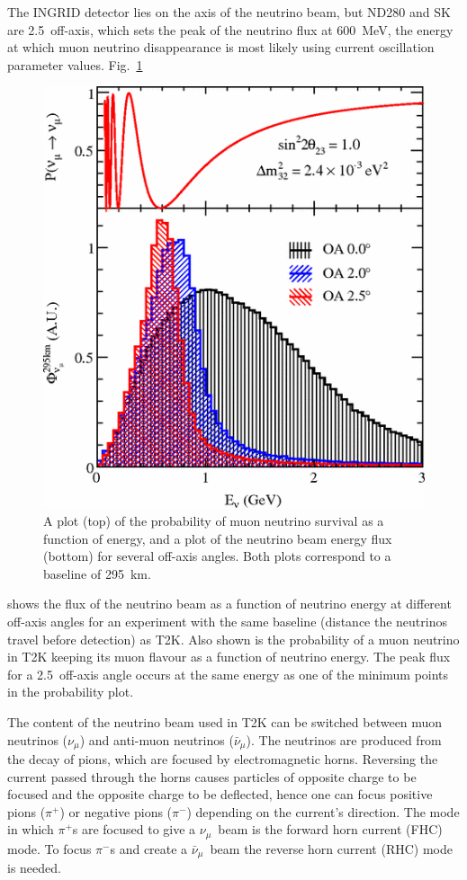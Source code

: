 \documentclass[aps,pra,12pt,notitlepage,tightenlines]{revtex4-1}
\newcommand{\numu}{$\nu_\mu$}
\newcommand{\anumu}{$\bar\nu_\mu$}
\begin{document}
The INGRID detector lies on the axis of the neutrino beam, but ND280 and SK are 2.5\degree\ off-axis, which sets the peak of the neutrino flux at 600~MeV, the energy at which muon neutrino disappearance is most likely using current oscillation parameter values. Fig.\ \ref{fig:axis} 
\begin{figure}
 \includegraphics[scale=0.5]{axis.png}
 \caption{A plot (top) of the probability of muon neutrino survival as a function of energy, and a plot of the neutrino beam energy flux (bottom) for several off-axis angles. Both plots correspond to a baseline of 295~km.}
 \label{fig:axis}
\end{figure}
shows the flux of the neutrino beam as a function of neutrino energy at different off-axis angles for an experiment with the same baseline (distance the neutrinos travel before detection) as T2K. Also shown is the probability of a muon neutrino in T2K keeping its muon flavour as a function of neutrino energy. The peak flux for a 2.5\degree\ off-axis angle occurs at the same energy as one of the minimum points in the probability plot.

The content of the neutrino beam used in T2K can be switched between muon neutrinos (\numu) and anti-muon neutrinos (\anumu). The neutrinos are produced from the decay of pions, which are focused by electromagnetic horns. Reversing the current passed through the horns causes particles of opposite charge to be focused and the opposite charge to be deflected, hence one can focus positive pions ($\pi^+$) or negative pions ($\pi^-$) depending on the current's direction. The mode in which $\pi^+$s are focused to give a \numu \ beam is the forward horn current (FHC) mode. To focus $\pi^-$s and create a \anumu \ beam the reverse horn current (RHC) mode is needed.
\end{document}
